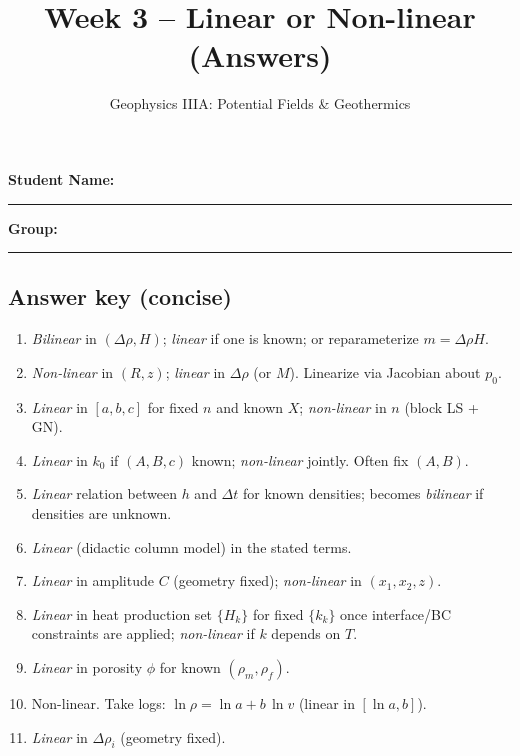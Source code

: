 \documentclass[11pt,a4paper]{article}
\title{Week 3 -- Linear or Non-linear (Answers)}
\author{Geophysics IIIA: Potential Fields \& Geothermics}
\date{}
\begin{document}
\maketitle

\noindent\textbf{Student Name:} \rule{0.45\linewidth}{0.4pt} \textbf{Group:} \rule{0.30\linewidth}{0.4pt}

\vspace{1em}
\subsection*{Answer key (concise)}
\begin{enumerate}[label=A\arabic*.,itemsep=6pt]
  \item \emph{Bilinear} in $(\Delta\rho,H)$; \emph{linear} if one is known; or reparameterize $m=\Delta\rho H$.
  \item \emph{Non-linear} in $(R,z)$; \emph{linear} in $\Delta\rho$ (or $M$). Linearize via Jacobian about $p_0$.
  \item \emph{Linear} in $[a,b,c]$ for fixed $n$ and known $X$; \emph{non-linear} in $n$ (block LS + GN).
  \item \emph{Linear} in $k_0$ if $(A,B,c)$ known; \emph{non-linear} jointly. Often fix $(A,B)$.
  \item \emph{Linear} relation between $h$ and $\Delta t$ for known densities; becomes \emph{bilinear} if densities are unknown.
  \item \emph{Linear} (didactic column model) in the stated terms.
  \item \emph{Linear} in amplitude $C$ (geometry fixed); \emph{non-linear} in $(x_1,x_2,z)$.
  \item \emph{Linear} in heat production set $\{H_k\}$ for fixed $\{k_k\}$ once interface/BC constraints are applied; \emph{non-linear} if $k$ depends on $T$.
  \item \emph{Linear} in porosity $\phi$ for known $(\rho_m,\rho_f)$.
  \item Non-linear. Take logs: $\ln\rho = \ln a + b\,\ln v$ (linear in $[\ln a, b]$).
  \item \emph{Linear} in $\Delta\rho_i$ (geometry fixed).
\end{enumerate}
\end{document}
